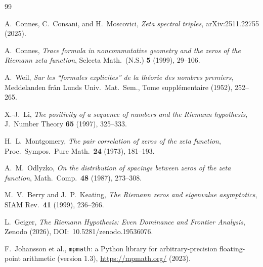 \documentclass[12pt,a4paper]{article}
\theoremstyle{definition}
\theoremstyle{remark}
\begin{document}
\begin{thebibliography}{99}

A.~Connes, C.~Consani, and H.~Moscovici,
\emph{Zeta spectral triples},
arXiv:2511.22755 (2025).

A.~Connes,
\emph{Trace formula in noncommutative geometry and the zeros of the
Riemann zeta function},
Selecta Math.~(N.S.) \textbf{5} (1999), 29--106.

A.~Weil,
\emph{Sur les ``formules explicites'' de la th{\'e}orie des nombres
premiers},
Meddelanden fr{\aa}n Lunds Univ.\ Mat.\ Sem., Tome suppl{\'e}mentaire
(1952), 252--265.

X.-J.~Li,
\emph{The positivity of a sequence of numbers and the Riemann hypothesis},
J.~Number Theory \textbf{65} (1997), 325--333.

H.~L.~Montgomery,
\emph{The pair correlation of zeros of the zeta function},
Proc.\ Sympos.\ Pure Math.\ \textbf{24} (1973), 181--193.

A.~M.~Odlyzko,
\emph{On the distribution of spacings between zeros of the zeta function},
Math.\ Comp.\ \textbf{48} (1987), 273--308.

M.~V.~Berry and J.~P.~Keating,
\emph{The Riemann zeros and eigenvalue asymptotics},
SIAM Rev.\ \textbf{41} (1999), 236--266.

L.~Geiger,
\emph{The Riemann Hypothesis: Even Dominance and Frontier Analysis},
Zenodo (2026), DOI:~10.5281/zenodo.19536076.

F.~Johansson et al.,
\texttt{mpmath}: a Python library for arbitrary-precision floating-point
arithmetic (version 1.3),
\url{https://mpmath.org/} (2023).

\end{thebibliography}
\end{document}

